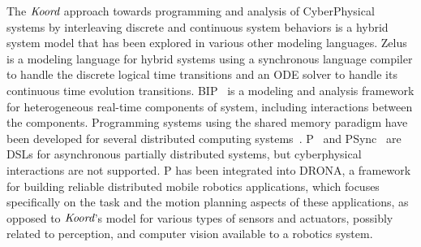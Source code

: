 

The $\emph{Koord}$ approach towards programming and analysis of CyberPhysical systems by interleaving discrete and continuous system behaviors is a hybrid system model that has been explored in various other modeling languages. Zelus~\cite{zelus} is a modeling language for hybrid systems using a synchronous language compiler to handle the discrete logical time transitions and an ODE solver to handle its continuous time evolution transitions. BIP~\cite{bip} is a modeling and analysis framework for heterogeneous real-time components of system, including interactions between the components.
%
Programming systems using the  shared memory paradigm have been developed for several distributed computing systems~\cite{dsm1991,Adve96sharedmemory,Azure,Cassandra,Dynamo}.  P~\cite{Planguage}  and PSync~\cite{PSyncLanguage} are DSLs for asynchronous partially distributed systems, but cyberphysical interactions are not supported. P has been integrated into DRONA, a framework for building reliable distributed mobile robotics applications, which focuses specifically on the task and the motion planning aspects of these applications, as opposed to $\emph{Koord}$'s model for various types of sensors and actuators, possibly related to perception, and computer vision available to a robotics system.




%




